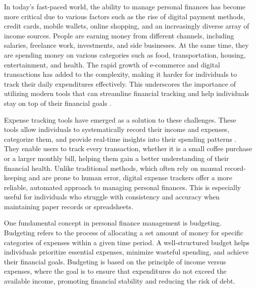 \documentclass[12pt]{report}
\begin{document}
In today's fast-paced world, the ability to manage personal finances has become more critical due to various factors such as the rise of digital payment methods, credit cards, mobile wallets, online shopping, and an increasingly diverse array of income sources. People are earning money from different channels, including salaries, freelance work, investments, and side businesses. At the same time, they are spending money on various categories such as food, transportation, housing, entertainment, and health. The rapid growth of e-commerce and digital transactions has added to the complexity, making it harder for individuals to track their daily expenditures effectively. This underscores the importance of utilizing modern tools that can streamline financial tracking and help individuals stay on top of their financial goals \citep{singh2021spending}.

Expense tracking tools have emerged as a solution to these challenges. These tools allow individuals to systematically record their income and expenses, categorize them, and provide real-time insights into their spending patterns \citep{chandini2019online, singh2021spending}. They enable users to track every transaction, whether it is a small coffee purchase or a larger monthly bill, helping them gain a better understanding of their financial health. Unlike traditional methods, which often rely on manual record-keeping and are prone to human error, digital expense trackers offer a more reliable, automated approach to managing personal finances. This is especially useful for individuals who struggle with consistency and accuracy when maintaining paper records or spreadsheets.

One fundamental concept in personal finance management is budgeting. Budgeting refers to the process of allocating a set amount of money for specific categories of expenses within a given time period. A well-structured budget helps individuals prioritize essential expenses, minimize wasteful spending, and achieve their financial goals. Budgeting is based on the principle of income versus expenses, where the goal is to ensure that expenditures do not exceed the available income, promoting financial stability and reducing the risk of debt.

\end{document}
